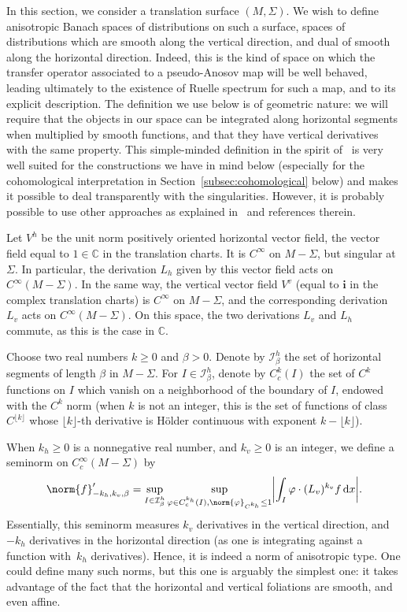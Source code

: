 \documentclass[10pt]{amsart}
\newcommand{\boI}{\mathcal{I}}
\newcommand{\CC}{\mathbb{C}}
\newcommand{\dd}{\mathop{}\!\mathrm{d}}
\newcommand{\ic}{\mathbf{i}}
\newcommand{\absgg}[1]{\biggl \lvert#1\biggr\rvert}
\let\phi\varphi
\theoremstyle{definition}
\numberwithin{equation}{section}
\begin{document}
In this section, we consider a translation surface $(M, \Sigma)$. We wish to
define anisotropic Banach spaces of distributions on such a surface, \ie spaces of distributions which are smooth along the vertical direction, and
dual of smooth along the horizontal direction. Indeed, this is the kind of
space on which the transfer operator associated to a pseudo-Anosov map will
be well behaved, leading ultimately to the existence of Ruelle spectrum for
such a map, and to its explicit description. The definition we use below is
of geometric nature: we will require that the objects in our space can be
integrated along horizontal segments when multiplied by smooth functions, and
that they have vertical derivatives with the same property. This
simple-minded definition in the spirit of~\cite{GL_Anosov2, avila_gouezel} is
very well suited for the constructions we have in mind below (especially for
the cohomological interpretation in Section~\ref{subsec:cohomological}
below) and makes it possible to deal transparently with the singularities.
However, it is probably possible to use other approaches as explained
in~\cite{baladi_ultimate} and references therein.

Let $V^h$ be the unit norm positively oriented horizontal vector field, \ie the vector field equal to $1 \in \CC$ in the translation charts. It is
$C^\infty$ on $M-\Sigma$, but singular at $\Sigma$. In particular, the
derivation $L_h$ given by this vector field acts on $C^\infty(M-\Sigma)$. In
the same way, the vertical vector field $V^v$ (equal to $\ic$ in the complex
translation charts) is $C^\infty$ on $M-\Sigma$, and the corresponding
derivation $L_v$ acts on $C^\infty(M-\Sigma)$. On this space, the two
derivations $L_v$ and $L_h$ commute, as this is the case in $\CC$.

Choose two real numbers $k\geq 0$ and $\beta >0$. Denote by $\boI^h_\beta$
the set of horizontal segments of length $\beta$ in $M-\Sigma$. For $I\in
\boI^h_\beta$, denote by $C^k_c(I)$ the set of $C^k$ functions on $I$ which
vanish on a neighborhood of the boundary of $I$, endowed with the $C^k$ norm
(when $k$ is not an integer, this is the set of functions of class
$C^{\lfloor k \rfloor}$ whose $\lfloor k \rfloor$-th derivative is Hölder
continuous with exponent $k-\lfloor k \rfloor$).

When $k_h\geq 0$ is a nonnegative real number, and $k_v\geq 0$ is an integer,
we define a seminorm on $C^\infty_c(M-\Sigma)$ by
\begin{equation*}
\norm{f}'_{-k_h, k_v, \beta} =
\sup_{I \in \boI^h_\beta} \sup_{\phi \in C^{k_h}_c(I),
\norm{\phi}_{C^{k_h}} \leq 1} \absgg{\int_I \phi \cdot (L_v)^{k_v} f \dd x}.
\end{equation*}
Essentially, this seminorm measures $k_v$ derivatives in the vertical
direction, and $-k_h$ derivatives in the horizontal direction (as one is
integrating against a function with~$k_h$ derivatives). Hence, it is indeed a
norm of anisotropic type. One could define many such norms, but this one is
arguably the simplest one: it takes advantage of the fact that the horizontal
and vertical foliations are smooth, and even affine.
\end{document}
